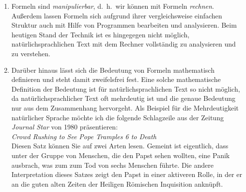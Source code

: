 \begin{enumerate}
\item Formeln sind \emph{manipulierbar}, d.~h.~wir können mit Formeln \emph{rechnen}.
      Außerdem lassen Formeln sich aufgrund ihrer vergleichsweise einfachen Struktur auch 
      mit Hilfe von Programmen bearbeiten und analysieren.  Beim heutigen Stand der Technik ist
      es hingegegen nicht möglich, natürlichsprachlichen Text mit dem Rechner vollständig
      zu analysieren und zu verstehen.
\item Darüber hinaus lässt sich die Bedeutung von Formeln mathematisch definieren und
      steht damit zweifelsfrei fest.  Eine solche mathematische Definition der Bedeutung
      ist für natürlichsprachlichen Text so nicht möglich, da
      natürlichsprachlicher Text oft mehrdeutig ist und die genaue Bedeutung nur
      aus dem Zusammenhang hervorgeht.  Als Beispiel für die Mehrdeutigkeit natürlicher
      Sprache möchte ich die folgende Schlagzeile aus der Zeitung \textsl{Journal Star}
      von 1980 präsentieren:
      \\[0.2cm]
      \hspace*{1.3cm}
      \textsl{Crowd Rushing to See Pope Tramples 6 to Death}
      \\[0.2cm]
      Diesen Satz können Sie auf zwei Arten lesen.  Gemeint ist eigentlich, dass unter der
      Gruppe von Menschen, die den Papst sehen wollten, eine Panik ausbrach, was zum zum
      Tod von sechs Menschen führte.  Die andere Interpretation dieses Satzes zeigt den
      Papst in einer aktiveren Rolle, in der er an die guten alten Zeiten der Heiligen
      Römischen Inquisition anknüpft.
\end{enumerate}

